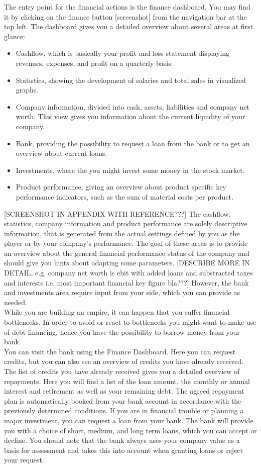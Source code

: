  The entry point for the financial actions is the finance dashboard. You may find it by clicking on the finance button [screenshot] from the navigation bar at the top left. The dashboard gives you a detailed overview about several areas at first glance:
\begin{itemize}
    \item Cashflow, which is basically your profit and loss statement displaying revenues, expenses, and profit on a quarterly basis.
    \item Statistics, showing the development of salaries and total sales in visualized graphs.
    \item Company information, divided into cash, assets, liabilities and company net worth. This view gives you information about the current liquidity of your company.
    \item Bank, providing the possibility to request a loan from the bank or to get an overview about current loans.
    \item Investments, where the you might invest some money in the stock market.
    \item Product performance, giving an overview about product specific key performance indicators, such as the sum of material costs per product.
\end{itemize}
[SCREENSHOT IN APPENDIX WITH REFERENCE???] The cashflow, statistics, company information and product performance are solely descriptive information, that is generated from the actual settings defined by you as the player or by your company’s performance. The goal of these areas is to provide an overview about the general financial performance status of the company and should give you hints about adapting some parameters. [DESCRIBE MORE IN DETAIL, e.g. company net worth is ebit with added loans and substracted taxes and interests i.e. most important financial key figure bla???] However, the bank and investments area require input from your side, which you can provide as needed. \\

While you are building an empire, it can happen that you suffer financial bottlenecks. In order to avoid or react to bottlenecks you might want to make use of debt financing, hence you have the possibility to borrow money from your bank. \\

You can visit the bank using the Finance Dashboard. Here you can request credits, but you can also see an overview of credits you have already received.
The list of credits you have already received gives you a detailed overview of repayments. Here you will find a list of the loan amount, the monthly or annual interest and retirement as well as your remaining debt. The agreed repayment plan is automatically booked from your bank account in accordance with the previously determined conditions.
If you are in financial trouble or planning a major investment, you can request a loan from your bank. The bank will provide you with a choice of short, medium, and long term loans, which you can accept or decline. You should note that the bank always uses your company value as a basis for assessment and takes this into account when granting loans or reject your request. \\

